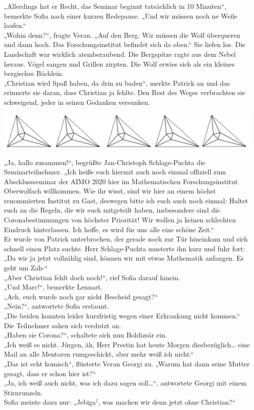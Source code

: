 \documentclass[oneside]{memoir}
\newcommand{\parasep}{
\bigskip
\bigskip
\begin{center} 
   \includegraphics[scale=.08]{parasep5.jpg} 
\end{center}
\bigskip
\bigskip
}
\begin{document}
„Allerdings hat er Recht, das Seminar beginnt tatsächlich in 10 Minuten“, bemerkte Sofia nach einer kurzen Redepause. „Und wir müssen noch ne Weile laufen.“  \\
„Wohin denn?“, fragte Veran. „Auf den Berg. Wir müssen die Wolf überqueren und dann hoch. Das Forschungsinstitut befindet sich da oben.“ Sie liefen los. Die Landschaft war wirklich atemberaubend. Die Bergspitze ragte aus dem Nebel heraus. Vögel sangen und Grillen zirpten. Die Wolf erwies sich als ein kleines bergisches Bächlein.  \\
„Christian wird Spaß haben, da drin zu baden“, merkte Patrick an und das erinnerte sie daran, dass Christian ja fehlte. Den Rest des Weges verbrachten sie schweigend, jeder in seinen Gedanken versunken.

\parasep

\noindent „Ja, hallo zusammen!“, begrüßte Jan-Christoph Schlage-Puchta die Seminarteilnehmer. „Ich heiße euch hiermit auch noch einmal offiziell zum Abschlussseminar der AIMO 2020 hier im Mathematischen Forschungsinstitut Oberwolfach willkommen. Wie ihr wisst, sind wir hier an einem höchst renommierten Institut zu Gast, deswegen bitte ich euch auch noch einmal: Haltet euch an die Regeln, die wir euch mitgeteilt haben, insbesondere sind die Coronabestimmungen von höchster Priorität! Wir wollen ja keinen schlechten Eindruck hinterlassen. Ich hoffe, es wird für uns alle eine schöne Zeit.“ \\
Er wurde von Patrick unterbrochen, der gerade noch zur Tür hineinkam und sich schnell einen Platz suchte. Herr Schlage-Puchta musterte ihn kurz und fuhr fort: „Da wir ja jetzt vollzählig sind, können wir mit etwas Mathematik anfangen. Es geht um Zah-“ \\
„Aber Christian fehlt doch noch!“, rief Sofia darauf hinein. \\
„Und Marc!“, bemerkte Lennart. \\
„Ach, euch wurde noch gar nicht Bescheid gesagt?“ \\
„Nein?“, antwortete Sofia erstaunt. \\
„Die beiden konnten leider kurzfristig wegen einer Erkrankung nicht kommen.“ \\
Die Teilnehmer sahen sich verdutzt an. \\
„Haben sie Corona?“, schaltete sich nun Boldizsár ein. \\
„Ich weiß es nicht. Jürgen, äh, Herr Prestin hat heute Morgen diesbezüglich\ldots{} eine Mail an alle Mentoren rumgeschickt, aber mehr weiß ich nicht.“ \\
„Das ist echt komisch“, flüsterte Veran Georgi zu. „Warum hat dann seine Mutter gesagt, dass er schon hier ist?“ \\
„Ja, ich weiß auch nicht, was ich dazu sagen soll\ldots“, antwortete Georgi mit einem Stirnrunzeln. \\
Sofia meinte dazu nur: „Jebiga$^{\dagger}$, was machen wir denn jetzt ohne Christian?“
\end{document}
